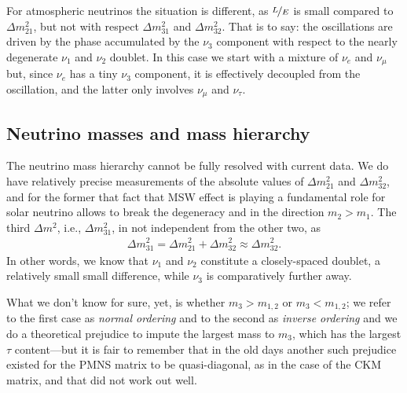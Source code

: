 For atmospheric neutrinos the situation is different, as $\nicefrac{L}{E}$ is
small compared to $\Delta m^2_{21}$, but not with respect $\Delta m^2_{31}$ and
$\Delta m^2_{32}$. That is to say: the oscillations are driven by the phase
accumulated by the $\nu_3$ component with respect to the nearly degenerate
$\nu_1$ and $\nu_2$ doublet.
In this case we start with a mixture of $\nu_e$ and $\nu_\mu$ but, since $\nu_e$
has a tiny $\nu_3$ component, it is effectively decoupled from the oscillation,
and the latter only involves $\nu_\mu$ and $\nu_\tau$.


\subsection{Neutrino masses and mass hierarchy}

The neutrino mass hierarchy cannot be fully resolved with current data. We do have
relatively precise measurements of the absolute values of $\Delta m^2_{21}$ and
$\Delta m^2_{32}$, and for the former that fact that MSW effect is playing a fundamental
role for solar neutrino allows to break the degeneracy and in the direction $m_2 > m_1$.
The third $\Delta m^2$, i.e., $\Delta m^2_{31}$, in not independent from the other
two, as
\begin{align*}
  \Delta m^2_{31} = \Delta m^2_{21} + \Delta m^2_{32} \approx \Delta m^2_{32}.
\end{align*}
In other words, we know that $\nu_1$ and $\nu_2$ constitute a closely-spaced doublet,
a relatively small small difference, while $\nu_3$ is comparatively further away.

\begin{marginfigure}
  
  \caption{Illustration of the behavior of the three neutrino masses, in normal and
  inverse ordering, as a function of $m_1$ (which is not yet well constrained by the
  experimental data).}
  \label{fig:neutrino_mass_scale}
\end{marginfigure}

What we don't know for sure, yet, is whether  $m_3 > m_{1,2}$ or $m_3 < m_{1,2}$;
we refer to the first case as \emph{normal ordering} and to the second as
\emph{inverse ordering} and we do a theoretical prejudice to impute the largest
mass to $m_3$, which has the largest $\tau$ content---but it is fair to remember
that in the old days another such prejudice existed for the PMNS matrix to be
quasi-diagonal, as in the case of the CKM matrix, and that did not work out well.

